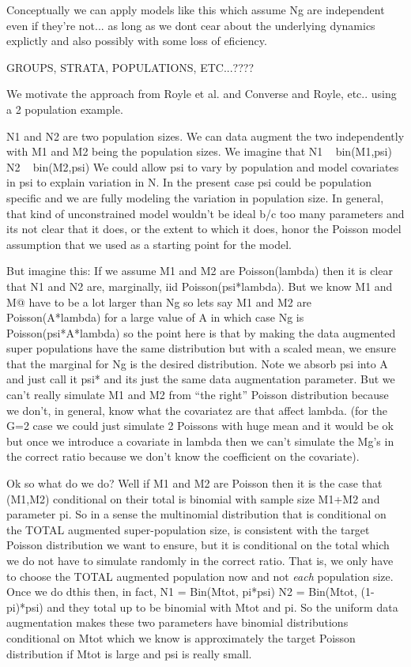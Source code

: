 Conceptually we can apply models like this which assume Ng are
independent even if they're not... as long as we dont cear about the
underlying dynamics explictly and also possibly with some loss of
eficiency. 

GROUPS, STRATA, POPULATIONS, ETC...????


We motivate the approach from Royle et al. and Converse and Royle,
etc.. using a 2 population example.

N1 and N2 are two population sizes. We can data augment the two
independently with M1 and M2 being the population sizes.  We imagine
that
N1 ~ bin(M1,psi)
N2 ~ bin(M2,psi)
We could allow psi to vary by population and model covariates in psi
to explain variation in N. In the present case psi could be population
specific and we are fully modeling the variation in population
size. In general, that kind of unconstrained model wouldn't be ideal
b/c too many parameters and its not clear that it does, or the extent
to which it does, honor the Poisson model assumption that we used as a
starting point for the model.

But imagine this: If we assume M1 and M2 are Poisson(lambda) then it
is clear that N1 and N2 are, marginally, iid Poisson(psi*lambda).  But
we know M1 and M@ have to be a lot larger than Ng so lets say M1 and
M2 are Poisson(A*lambda) for a large value of A in which case Ng is
Poisson(psi*A*lambda) so the point here is that by making the data
augmented super populations have the same distribution but with a
scaled mean, we ensure that the marginal for Ng is the desired
distribution. Note we absorb psi into A and just call it psi* and its
just the same data augmentation parameter.  But we can't really
simulate M1 and M2 from ``the right'' Poisson distribution because we
don't, in general, know what the covariatez are that affect
lambda. (for the G=2 case we could just simulate 2 Poissons with huge
mean and it would be ok but once we introduce a covariate in lambda
then we can't simulate the Mg's in the correct ratio because we don't
know the coefficient on the covariate).

Ok so what do we do?
Well if M1 and M2 are Poisson then it is the case that (M1,M2)
conditional on their total is binomial with sample size M1+M2 and
parameter pi. So in a sense the multinomial distribution that is
conditional on the TOTAL augmented super-population size, is
consistent with the target Poisson distribution we want to ensure, but
it is conditional on the total which we do not have to simulate
randomly in the correct ratio.   That is, we only have to choose the
TOTAL augmented population now and not {\it each} population
size. Once we do dthis then, in fact,
N1 = Bin(Mtot, pi*psi)
N2 = Bin(Mtot, (1-pi)*psi)
and they total up to be binomial with Mtot and pi. So the uniform data
augmentation makes these two parameters have binomial distributions
conditional on Mtot which we know is approximately the target Poisson
distribution if Mtot is large and psi is really small. 

